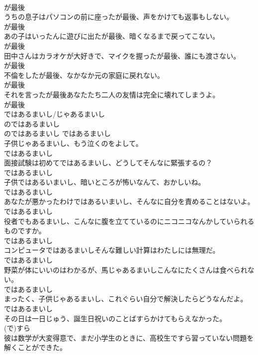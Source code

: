 \documentclass[8pt]{extreport}
\begin{document}
\begin{CJK}{UTF8}{min}
\\	が最後
\\	うちの息子はパソコンの前に座ったが最後、声をかけても返事もしない。	
\\	が最後
\\	あの子はいったんに遊びに出たが最後、暗くなるまで戻ってこない。	
\\	が最後
\\	田中さんはカラオケが大好きで、マイクを握ったが最後、誰にも渡さない。	
\\	が最後
\\	不倫をしたが最後、なかなか元の家庭に戻れない。	
\\	が最後
\\	それを言ったが最後あなたたち二人の友情は完全に壊れてしまうよ。	
\\	が最後
\\	ではあるまいし/じゃあるまいし	
\\	のではあるまいし	
\\	のではあるまいし	ではあるまいし
\\	子供じゃあるまいし、もう泣くのをよして。	
\\	ではあるまいし
\\	面接試験は初めてではあるまいし、どうしてそんなに緊張するの？	
\\	ではあるまいし
\\	子供ではあるいまいし、暗いところが怖いなんて、おかしいね。	
\\	ではあるまいし
\\	あなたが悪かったわけではあるいまいし、そんなに自分を責めることはないよ。	
\\	ではあるまいし
\\	役者でもあるまいし、こんなに腹を立てているのにニコニコなんかしていられるものですか。	
\\	ではあるまいし
\\	コンピュータではあるまいしそんな難しい計算はわたしには無理だ。	
\\	ではあるまいし
\\	野菜が体にいいのはわかるが、馬じゃあるまいしこんなにたくさんは食べられない。	
\\	ではあるまいし
\\	まったく、子供じゃあるまいし、これぐらい自分で解決したらどうなんだよ。	
\\	ではあるまいし
\\	その日は一日じゅう、誕生日祝いのことばすらかけてもらえなかった。	
\\	(で)すら
\\	彼は数学が大変得意で、まだ小学生のときに、高校生ですら習っていない問題を解くことができた。	

\end{CJK}
\end{document}
